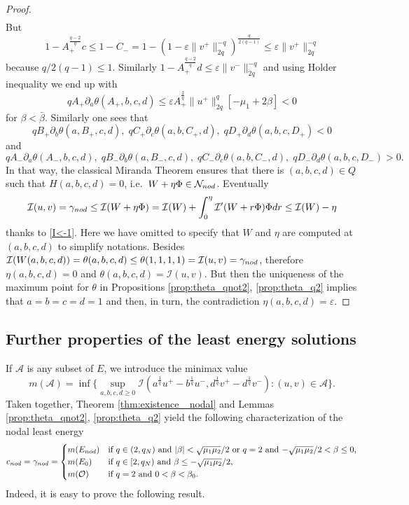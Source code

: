 \documentclass[10pt,a4paper]{amsart}
\numberwithin{equation}{section}
\begin{document}
\begin{proof}
\begin{align*}
\end{align*}
But
\[
1-A_+^{\frac{q-2}q}c \le  1- C_-
= 1- \left(1-\varepsilon\|v^+\|_{2q}^{-q}\right)^{\frac{q}{2(q-1)}} \le\varepsilon\|v^+\|_{2q}^{-q}
\]
because $q/2(q-1)\le 1$. Similarly $1-A_+^{\frac{q-2}q}d \le \varepsilon\|v^-\|_{2q}^{-q} $
and using Holder inequality we end up with
\[
 q A_+ \partial_a\theta(A_+,b,c,d)
 \le \varepsilon A_+^{\frac{2}q}\|u^+\|_{2q}^{q} \left[ -\mu_1 +2\beta \right] <0
\]
for $\beta <\bar \beta$. Similarly one sees that
 \[
q B_+ \partial_b\theta(a,B_+,c,d), \; q C_+ \partial_c\theta(a,b, C_+,d),
\; q D_+ \partial_d\theta(a,b,c,D_+)< 0
\]
and
\[   q A_- \partial_a\theta(A_-,b,c,d) ,
 \; q B_-\partial_b\theta(a,B_-,c,d),
  \; q C_- \partial_c\theta(a,b, C_-,d),
  \; q D_- \partial_d\theta(a,b,c,D_-) >0 .
\]
In that way, the classical Miranda Theorem \cite{Miranda} ensures that there is
$(a,b,c,d)\in Q$ such that $H(a,b,c,d) =0$, i.e.\
$W+\eta\Phi\in \mathcal N_{\rm nod}$. Eventually
\[
  \mathcal I(u,v) = \gamma_{\rm nod} \le \mathcal I(W+\eta\Phi)
  = \mathcal I(W)+ \int_0^{\eta}  \mathcal I'(W+r\Phi) \Phi dr \le \mathcal I(W) - \eta
\]
thanks to \eqref{I<-1}.
Here we have omitted to specify that $W$ and $\eta$ are computed at $(a,b,c,d)$
to simplify notations.
 Besides $\mathcal I(W(a,b,c,d)) =\theta(a,b,c,d) \le \theta(1,1,1,1)
 = \mathcal I(u,v)=\gamma_{\rm nod}$, therefore
$\eta(a,b,c,d)=0$ and $\theta(a,b,c,d) =\mathcal I(u,v)$.
 But then the uniqueness of the maximum point for $\theta$ in
Propositions \ref{prop:theta_qnot2}, \ref{prop:theta_q2} implies that $a=b=c=d=1$
and then, in turn, the contradiction $\eta(a,b,c,d)=\varepsilon$.
\end{proof}

\subsection{Further properties of the least energy solutions}\label{sub:properties_lesc}

If $\mathcal A$ is any subset of $E$, we introduce the minimax value
\[
m(\mathcal A)=  \inf\big\{ \sup_{a,b,c,d\ge 0} \mathcal I (a^{\frac{1}q}u^+
-b^{\frac{1}q}u^-, d^{\frac{1}q}v^+-d^{\frac{1}q}v^-) : (u,v)\in \mathcal A\big\} .
 \]
Taken together, Theorem \ref{thm:existence_ nodal} and Lemmas
\ref{prop:theta_qnot2}, \ref{prop:theta_q2} yield the following  characterization of
the nodal least energy
\[
 c_{\rm nod}=\gamma_{\rm nod}= \begin{cases}
 m({E_{\rm nod}})& \text{if $q\in (2, q_N)$ and  $|\beta|<\sqrt{\mu_1\mu_2}/2 $
  or $q=2$ and $-\sqrt{\mu_1\mu_2}/2 <\beta\le 0$,} \\
 m({E_0}) & \text{if $q\in [2, q_N)$ and $ \beta \le - \sqrt{\mu_1\mu_2}/2$,}  \\
 m({\mathcal O}) & \text{if $q=2$ and  $0<\beta <\beta_0$.}
\end{cases}
\]
Indeed, it is easy to prove the following result.
\end{document}
